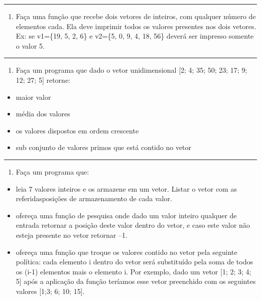 \documentclass[12pt,a4paper]{article}
\renewcommand{\linethickness}{0.05em}
\providecommand{\tightlist}{%
      \setlength{\itemsep}{0pt}\setlength{\parskip}{0pt}}
\begin{document}
    \begin{center}\rule{0.5\linewidth}{\linethickness}\end{center}

\begin{enumerate}
\def\labelenumi{\arabic{enumi}.}
\setcounter{enumi}{14}
\tightlist
\item
  Faça uma função que recebe dois vetores de inteiros, com qualquer
  número de elementos cada. Ela deve imprimir todos os valores presentes
  nos dois vetores. Ex: se v1=\{19, 5, 2, 6\} e v2=\{5, 0, 9, 4, 18,
  56\} deverá ser impresso somente o valor 5.
\end{enumerate}

    \begin{center}\rule{0.5\linewidth}{\linethickness}\end{center}

\begin{enumerate}
\def\labelenumi{\arabic{enumi}.}
\setcounter{enumi}{15}
\tightlist
\item
  Faça um programa que dado o vetor unidimensional {[}2; 4; 35; 50; 23;
  17; 9; 12; 27; 5{]} retorne:\\
\end{enumerate}

\begin{itemize}
\tightlist
\item
  maior valor
\item
  média dos valores
\item
  os valores dispostos em ordem crescente
\item
  sub conjunto de valores primos que está contido no vetor
\end{itemize}

    \begin{center}\rule{0.5\linewidth}{\linethickness}\end{center}

\begin{enumerate}
\def\labelenumi{\arabic{enumi}.}
\setcounter{enumi}{16}
\tightlist
\item
  Faça um programa que:
\end{enumerate}

\begin{itemize}
\tightlist
\item
  leia 7 valores inteiros e os armazene em um vetor. Listar o vetor com
  as referidasposições de armazenamento de cada valor.
\item
  ofereça uma função de pesquisa onde dado um valor inteiro qualquer de
  entrada retornar a posição deste valor dentro do vetor, e caso este
  valor não esteja presente no vetor retornar --1.
\item
  ofereça uma função que troque os valores contido no vetor pela
  seguinte política: cada elemento i dentro do vetor será substituído
  pela soma de todos os (i-1) elementos mais o elemento i. Por exemplo,
  dado um vetor {[}1; 2; 3; 4; 5{]} após a aplicação da função teríamos
  esse vetor preenchido com os seguintes valores {[}1;3; 6; 10; 15{]}.
\end{itemize}
\end{document}
